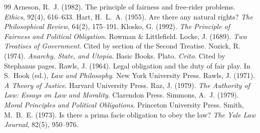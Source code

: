 \documentclass{situationist-preprint}
\begin{document}
\begin{thebibliography}{99}\small
{} Arneson, R.~J. (1982). The principle of fairness and free-rider problems. \emph{Ethics}, 92(4), 616--633.
 Hart, H.~L.~A. (1955). Are there any natural rights? \emph{The Philosophical Review}, 64(2), 175--191.
 Klosko, G. (1992). \emph{The Principle of Fairness and Political Obligation}. Rowman \& Littlefield.
 Locke, J. (1689). \emph{Two Treatises of Government}. Cited by section of the Second Treatise.
 Nozick, R. (1974). \emph{Anarchy, State, and Utopia}. Basic Books.
 Plato. \emph{Crito}. Cited by Stephanus pages.
 Rawls, J. (1964). Legal obligation and the duty of fair play. In S.~Hook (ed.), \emph{Law and Philosophy}. New York University Press.
 Rawls, J. (1971). \emph{A Theory of Justice}. Harvard University Press.
 Raz, J. (1979). \emph{The Authority of Law: Essays on Law and Morality}. Clarendon Press.
 Simmons, A.~J. (1979). \emph{Moral Principles and Political Obligations}. Princeton University Press.
 Smith, M.~B.~E. (1973). Is there a prima facie obligation to obey the law? \emph{The Yale Law Journal}, 82(5), 950--976.
\end{thebibliography}
\end{document}
